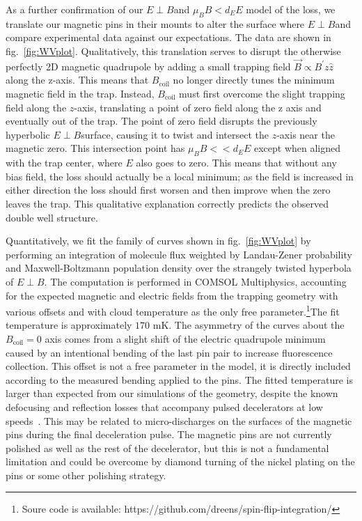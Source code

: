 \documentclass[%
 reprint,
groupedaddress,
 amsmath,amssymb,
 aps,
prl,
]{revtex4-1}
\newcommand{\epb}{$E\!\perp\!B$}
\begin{document}
As a further confirmation of our \epb and $\mu_BB<d_EE$ model of the loss, we translate our magnetic pins in their mounts to alter the surface where \epb and compare experimental data against our expectations. The data are shown in fig.~\ref{fig:WVplot}. Qualitatively, this translation serves to disrupt the otherwise perfectly 2D magnetic quadrupole by adding a small trapping field $\vec{B}\propto B^\prime z\hat{z}$ along the z-axis. This means that $B_\text{coil}$ no longer directly tunes the minimum magnetic field in the trap. Instead, $B_\text{coil}$ must first overcome the slight trapping field along the $z$-axis, translating a point of zero field along the z axis and eventually out of the trap. The point of zero field disrupts the previously hyperbolic \epb surface, causing it to twist and intersect the $z$-axis near the magnetic zero. This intersection point has $\mu_BB<< d_EE$ except when aligned with the trap center, where $E$ also goes to zero. This means that without any bias field, the loss should actually be a local minimum; as the field is increased in either direction the loss should first worsen and then improve when the zero leaves the trap. This qualitative explanation correctly predicts the observed double well structure.

Quantitatively, we fit the family of curves shown in fig.~\ref{fig:WVplot} by performing an integration of molecule flux weighted by Landau-Zener probability and Maxwell-Boltzmann population density over the strangely twisted hyperbola of \epb. The computation is performed in COMSOL Multiphysics, accounting for the expected magnetic and electric fields from the trapping geometry with various offsets and with cloud temperature as the only free parameter.\footnote{Soure code is available: https://github.com/dreens/spin-flip-integration/}The fit temperature is approximately $170\text{ mK}$. The asymmetry of the curves about the $B_\text{coil}=0$ axis comes from a slight shift of the electric quadrupole minimum caused by an intentional bending of the last pin pair to increase fluorescence collection. This offset is not a free parameter in the model, it is directly included according to the measured bending applied to the pins. The fitted temperature is larger than expected from our simulations of the geometry, despite the known defocusing and reflection losses that accompany pulsed decelerators at low speeds~\cite{Sawyer2008a}. This may be related to micro-discharges on the surfaces of the magnetic pins during the final deceleration pulse. The magnetic pins are not currently polished as well as the rest of the decelerator, but this is not a fundamental limitation and could be overcome by diamond turning of the nickel plating on the pins or some other polishing strategy.
\end{document}

